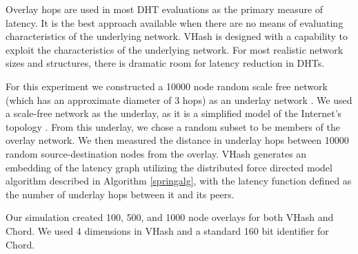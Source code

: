\documentclass[10pt, conference, letterpaper]{IEEEtran}
\begin{document}
Overlay hops are used in most DHT evaluations as the primary measure of latency.
It is the best approach available when there are no means of evaluating characteristics of the underlying network.
VHash is designed with a capability to exploit the characteristics of the underlying network.
For most realistic network sizes and structures, there is dramatic room for latency reduction in DHTs.



For this experiment we constructed a 10000 node random scale free network (which has an approximate diameter of 3 hops) as an underlay network \cite{cohen2000resilience} \cite{pastor2001epidemic} \cite{hagberg2004}.
We used a scale-free network as the underlay, as it is a simplified model of the Internet's topology \cite{cohen2000resilience} \cite{pastor2001epidemic}.
From this underlay, we chose a random subset to be members of the overlay network.
We then measured the distance in underlay hops between 10000 random source-destination nodes from the overlay. 
VHash generates an embedding of the latency graph utilizing the distributed force directed model algorithm described in Algorithm \ref{springalg}, with the latency function defined as the number of underlay hops between it and its peers.

Our simulation created 100, 500, and 1000 node overlays for both VHash and Chord.
We used 4 dimensions in VHash and a standard 160 bit identifier for Chord.
\end{document}
